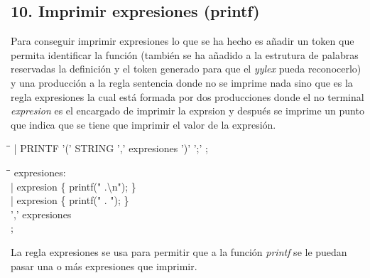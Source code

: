 \documentclass[11pt,spanish]{article}
\begin{document}
		\subsection*{10. Imprimir expresiones (printf)}
		\label{subsec:10}
		Para conseguir imprimir expresiones lo que se ha hecho es añadir un token que permita identificar la función (también se ha añadido a la estrutura de palabras reservadas la definición y el token generado para que el \textit {yylex} pueda reconocerlo) y una producción a la regla {\ttfamily sentencia} donde no se imprime nada sino que es la regla {\ttfamily expresiones} la cual está formada por dos producciones donde el no terminal \textit {expresion} es el encargado de imprimir la exprsion y después se imprime un punto que indica que se tiene que imprimir el valor de la expresión.
		\begin{tcolorbox}
		\begin{tabbing}
			\hspace*{1cm}\= \hspace*{4cm}\=\kill
			| PRINTF '(' STRING ',' expresiones ')' ';'
			;
		\end{tabbing}
		\end{tcolorbox}
		\begin{tcolorbox}
		\begin{tabbing}
			\hspace*{1cm}\=\hspace*{1cm}\= \hspace*{6cm}\=\kill
			expresiones:\\
					\>| expresion\> \> \{ printf(" .\textbackslash n"); \}\\
					\>| expresion\> \> \{ printf(" . "); \}\\
					\>\>',' expresiones\\
			;
		\end{tabbing}
		\end{tcolorbox}
		La regla {\ttfamily expresiones} se usa para permitir que a la función \textit {printf} se le puedan pasar una o más expresiones que imprimir.
\end{document}
